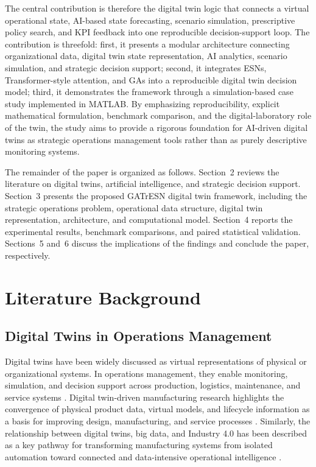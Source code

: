 \documentclass[apajournal,article,submit,pdftex,moreauthors]{Definitions/mdpi}
\begin{document}
The central contribution is therefore the digital twin logic that connects a virtual operational state, AI-based state forecasting, scenario simulation, prescriptive policy search, and KPI feedback into one reproducible decision-support loop. The contribution is threefold: first, it presents a modular architecture connecting organizational data, digital twin state representation, AI analytics, scenario simulation, and strategic decision support; second, it integrates ESNs, Transformer-style attention, and GAs into a reproducible digital twin decision model; third, it demonstrates the framework through a simulation-based case study implemented in MATLAB. By emphasizing reproducibility, explicit mathematical formulation, benchmark comparison, and the digital-laboratory role of the twin, the study aims to provide a rigorous foundation for AI-driven digital twins as strategic operations management tools rather than as purely descriptive monitoring systems.

The remainder of the paper is organized as follows. Section~2 reviews the literature on digital twins, artificial intelligence, and strategic decision support. Section~3 presents the proposed GATrESN digital twin framework, including the strategic operations problem, operational data structure, digital twin representation, architecture, and computational model. Section~4 reports the experimental results, benchmark comparisons, and paired statistical validation. Sections~5 and~6 discuss the implications of the findings and conclude the paper, respectively.

\section{Literature Background}
\subsection{Digital Twins in Operations Management}
Digital twins have been widely discussed as virtual representations of physical or organizational systems. In operations management, they enable monitoring, simulation, and decision support across production, logistics, maintenance, and service systems \citep{tao2018digital,tao2019digital,fuller2020digital,zheng2022smart,singh2023review}. Digital twin-driven manufacturing research highlights the convergence of physical product data, virtual models, and lifecycle information as a basis for improving design, manufacturing, and service processes \citep{tao2018digital,kusiak2018smart,uhlemann2019digital,zhang2020knowledge}. Similarly, the relationship between digital twins, big data, and Industry 4.0 has been described as a key pathway for transforming manufacturing systems from isolated automation toward connected and data-intensive operational intelligence \citep{qi2018digital,tortorella2021industry,holmstrom2020digital}.
\end{document}
